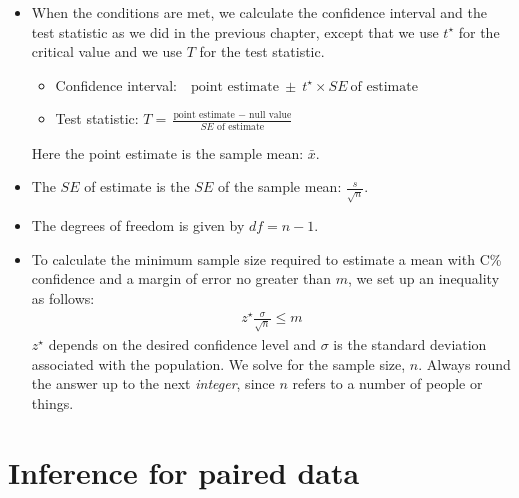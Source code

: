 \begin{itemize}
\item When the conditions are met, we calculate the confidence interval and the test statistic as we did in the previous chapter, except that we use $t^{\star}$ for the critical value and we use $T$ for the test statistic.

\begin{itemize}
\setlength{\itemsep}{2mm}
\item[] Confidence interval:\ \  $\text{point estimate}\ \pm\ t^{\star} \times SE\ \text{of estimate}$
\item[] Test statistic:  $T = \frac{\text{point estimate } - \text{ null value}}{SE \text{ of estimate}}$ 
\end{itemize}
Here the point estimate is the sample mean: $\bar{x}$.
\item[] The $SE$ of estimate is the $SE$ of the sample mean: $\frac{s}{\sqrt{n}}$.
\item[] The degrees of freedom is given by $df = n-1$.

\item To calculate the minimum sample size required to estimate a mean with C\% confidence and a margin of error no greater than $m$, we set up an inequality as follows: 
\begin{align*}
z^{\star}\frac{\sigma}{\sqrt{n}}\leq m
\end{align*}
$z^{\star}$ depends on the desired confidence level and $\sigma$ is the standard deviation associated with the population. We solve for the sample size, $n$.  Always round the answer up to the next \emph{integer}, since $n$ refers to a number of people or things. 

\end{itemize}


{}


\section[Inference for paired data]{Inference for paired data }

\label{pairedData}


